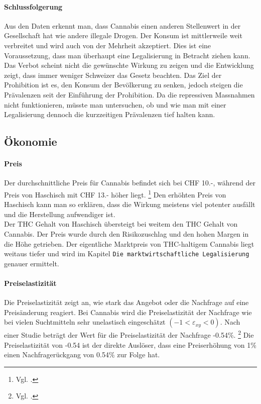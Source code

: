 \documentclass[../main.tex]{subfiles}
\begin{document}
	\paragraph{Schlussfolgerung}
	Aus den Daten erkennt man, dass Cannabis einen anderen Stellenwert in der Gesellschaft hat wie andere illegale Drogen.
	Der Konsum ist mittlerweile weit verbreitet und wird auch von der Mehrheit akzeptiert.
	Dies ist eine Voraussetzung, dass man überhaupt eine Legalisierung in Betracht ziehen kann.
	Das Verbot scheint nicht die gewünschte Wirkung zu zeigen und die Entwicklung zeigt, dass immer weniger Schweizer das Gesetz beachten.
	Das Ziel der Prohibition ist es, den Konsum der Bevölkerung zu senken, jedoch steigen die Prävalenzen seit der Einführung der Prohibition.
	Da die repressiven Massnahmen nicht funktionieren, müsste man untersuchen, ob und wie man mit einer Legalisierung dennoch die kurzzeitigen Prävalenzen tief halten kann.
	
	
	\subsection{Ökonomie}
	
	\paragraph{Preis}
	Der durchschnittliche Preis für Cannabis befindet sich bei CHF 10.-, während der Preis von Haschisch mit CHF 13.- höher liegt.%
	\footnote{Vgl. \cite{zobel}.}
	Den erhöhten Preis von Haschisch kann man so erklären, dass die Wirkung meistens viel potenter ausfällt und die Herstellung aufwendiger ist.\\
	
	\noindent
	Der THC Gehalt von Haschisch übersteigt bei weitem den THC Gehalt von Cannabis.
	Der Preis wurde durch den Risikozuschlag und den hohen Margen in die Höhe getrieben.
	Der eigentliche Marktpreis von THC-haltigem Cannabis liegt weitaus tiefer und wird im Kapitel \texttt{Die marktwirtschaftliche Legalisierung} genauer ermittelt.
	
	\paragraph{Preiselastizität}
	Die Preiselastizität zeigt an, wie stark das Angebot oder die Nachfrage auf eine Preisänderung reagiert.
	Bei Cannabis wird die Preiselastizität der Nachfrage wie bei vielen Suchtmitteln sehr unelastisch eingeschätzt $(-1<\varepsilon_{xy}<0)$. 
	Nach einer Studie beträgt der Wert für die Preiselastizität der Nachfrage -0.54\%.%
	\footnote{Vgl. \cite{golzar}.}
	Die Preiselastizität von -0.54 ist der direkte Auslöser, dass eine Preiserhöhung von 1\% einen Nachfragerückgang von 0.54\% zur Folge hat.\\
	
\end{document}
